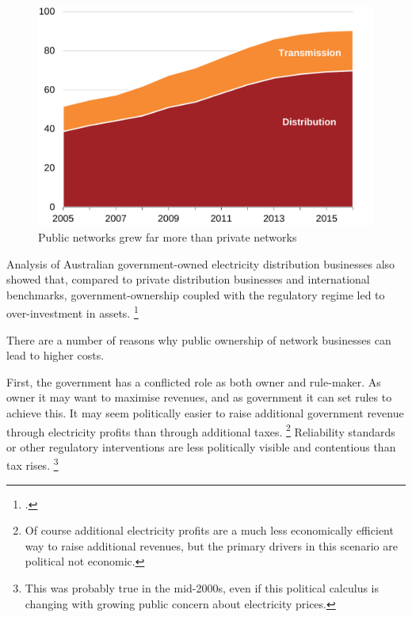 \documentclass[FrontPage]{grattan}
\begin{document}
\begin{figure}
\caption{Public networks grew far more than private networks}\label{fig:Public-v-private-RAB-per-customer}
\includegraphics[page=27]{atlas/Charts.pdf}
\end{figure}

Analysis of Australian government-owned electricity distribution businesses also showed that, compared to private distribution businesses and international benchmarks, government-ownership coupled with the regulatory regime led to over-investment in assets.%
\footcites{Mountain2017PhD}{Mountain2018NetworkArticleInPress}

There are a number of reasons why public ownership of network businesses can lead to higher costs.

First, the government has a conflicted role as both owner and rule-maker. As owner it may want to maximise revenues, and as government it can set rules to achieve this. It may seem politically easier to raise additional government revenue through electricity profits than through additional taxes.%
\footnote{Of course additional electricity profits are a much less economically efficient way to raise additional revenues, but the primary drivers in this scenario are political not economic.}
Reliability standards or other regulatory interventions are less politically visible and contentious than tax rises.%
\footnote{This was probably true in the mid-2000s, even if this political calculus is changing with growing public concern about electricity prices.}
\end{document}
